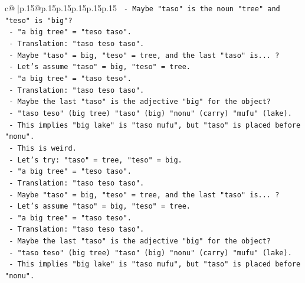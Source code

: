 \documentclass{article}
\begin{document}
{\begin{supertabular}{c@{$\;$}|p{.15\linewidth}@{}p{.15\linewidth}p{.15\linewidth}p{.15\linewidth}p{.15\linewidth}p{.15\linewidth}}
{{{\texttt{                          {-} Maybe "taso" is the noun "tree" and "teso" is "big"?} \\
\texttt{                            {-} "a big tree" = "teso taso".} \\
\texttt{                            {-} Translation: "taso teso taso".} \\
\texttt{                            {-} Maybe "taso" = big, "teso" = tree, and the last "taso" is... ?} \\
\texttt{                            {-} Let's assume "taso" = big, "teso" = tree.} \\
\texttt{                            {-} "a big tree" = "taso teso".} \\
\texttt{                            {-} Translation: "taso teso taso".} \\
\texttt{                            {-} Maybe the last "taso" is the adjective "big" for the object?} \\
\texttt{                            {-} "taso teso" (big tree) "taso" (big) "nonu" (carry) "mufu" (lake).} \\
\texttt{                            {-} This implies "big lake" is "taso mufu", but "taso" is placed before "nonu".} \\
\texttt{                            {-} This is weird.} \\
\texttt{                            {-} Let's try: "taso" = tree, "teso" = big.} \\
\texttt{                            {-} "a big tree" = "teso taso".} \\
\texttt{                            {-} Translation: "taso teso taso".} \\
\texttt{                            {-} Maybe "taso" = big, "teso" = tree, and the last "taso" is... ?} \\
\texttt{                            {-} Let's assume "taso" = big, "teso" = tree.} \\
\texttt{                            {-} "a big tree" = "taso teso".} \\
\texttt{                            {-} Translation: "taso teso taso".} \\
\texttt{                            {-} Maybe the last "taso" is the adjective "big" for the object?} \\
\texttt{                            {-} "taso teso" (big tree) "taso" (big) "nonu" (carry) "mufu" (lake).} \\
\texttt{                            {-} This implies "big lake" is "taso mufu", but "taso" is placed before "nonu".} \\
}}}
\end{supertabular}}
\end{document}
